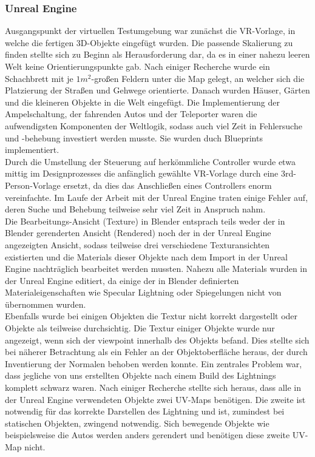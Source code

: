 \documentclass{Bericht}
\begin{document}
\subsubsection{Unreal Engine}
Ausgangspunkt der virtuellen Testumgebung war zunächst die VR-Vorlage, in welche die fertigen 3D-Objekte eingefügt wurden. Die passende Skalierung zu finden stellte sich zu Beginn als Herausforderung dar, da es in einer nahezu leeren Welt keine Orientierungspunkte gab. Nach einiger Recherche wurde ein Schachbrett mit je $1m^{2}$-großen Feldern unter die Map gelegt, an welcher sich die Platzierung der Straßen und Gehwege orientierte. Danach wurden Häuser, Gärten und die kleineren Objekte in die Welt eingefügt.
Die Implementierung der Ampelschaltung, der fahrenden Autos und der Teleporter waren die aufwendigsten Komponenten der Weltlogik, sodass auch viel Zeit in Fehlersuche und -behebung investiert werden musste. Sie wurden duch Blueprints implementiert.\\
		Durch die Umstellung der Steuerung auf herkömmliche Controller wurde etwa mittig im Designprozesses die anfänglich gewählte VR-Vorlage durch eine 3rd-Person-Vorlage ersetzt, da dies das Anschließen eines Controllers enorm vereinfachte.
				Im Laufe der Arbeit mit der Unreal Engine traten einige Fehler auf, deren Suche und Behebung teilweise sehr viel Zeit in Anspruch nahm.\\
Die Bearbeitungs-Ansicht (Texture) in Blender entsprach teils weder der in Blender gerenderten Ansicht (Rendered) noch der in der Unreal Engine angezeigten Ansicht, sodass teilweise drei verschiedene Texturansichten existierten und die Materials dieser Objekte nach dem Import in der Unreal Engine nachträglich bearbeitet werden mussten. Nahezu alle Materials wurden in der Unreal Engine editiert, da einige der in Blender definierten  Materialeigenschaften wie Specular Lightning oder Spiegelungen nicht von übernommen wurden.\\
Ebenfalls wurde bei einigen Objekten die Textur nicht korrekt dargestellt oder Objekte als teilweise durchsichtig. 
Die Textur einiger Objekte wurde nur angezeigt, wenn sich der viewpoint innerhalb des Objekts befand. Dies stellte sich bei näherer Betrachtung als ein Fehler an der Objektoberfläche heraus, der durch Inventierung der Normalen behoben werden konnte.		
Ein zentrales Problem war, dass jegliche von uns erstellten Objekte nach einem Build des Lightnings komplett schwarz waren. Nach einiger Recherche stellte sich heraus, dass alle in der Unreal Engine verwendeten Objekte zwei UV-Maps benötigen. Die zweite ist notwendig für das korrekte Darstellen des Lightning und ist, zumindest bei statischen Objekten, zwingend notwendig. Sich bewegende Objekte wie beispielsweise die Autos werden anders gerendert und benötigen diese zweite UV-Map nicht. 
		
\end{document}
